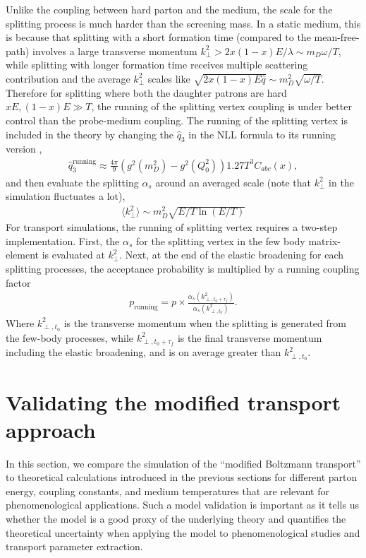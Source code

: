 Unlike the coupling between hard parton and the medium, the scale for the splitting process is much harder than the screening mass.
In a static medium, this is because that splitting with a short formation time (compared to the mean-free-path) involves a large transverse momentum $k_\perp^2 > 2x(1-x)E /\lambda \sim m_D \omega/T$, while splitting with longer formation time receives multiple scattering contribution and the average $k_\perp^2$ scales like $\sqrt{2x(1-x)E\hat{q}} \sim m_D^2 \sqrt{\omega/T}$.
Therefore for splitting where both the daughter patrons are hard $xE, (1-x)E \gg T$, the running of the splitting vertex coupling is under better control than the probe-medium coupling.
The running of the splitting vertex is included in the theory by changing the $\hat{q}_3$ in the NLL formula to its running version  \cite{Arnold:2008zu},
\begin{eqnarray}
\hat{q}_3^{\textrm{running}} \approx \frac{4\pi}{9}\left(g^2(m_D^2) - g^2(Q_0^2)\right) 1.27 T^3 C_{abc}(x),
\label{eq:q3running}
\end{eqnarray}
and then evaluate the splitting $\alpha_s$ around an averaged scale (note that $k_\perp^2$ in the simulation fluctuates a lot),
\begin{eqnarray}
\langle k_\perp^2\rangle \sim m_D^2 \sqrt{E/T\ln(E/T)}
\label{eq:runscale}
\end{eqnarray}  
For transport simulations, the running of splitting vertex requires a two-step implementation. 
First, the $\alpha_s$ for the splitting vertex in the few body matrix-element is evaluated at $k_\perp^2$.
Next, at the end of the elastic broadening for each splitting processes, the acceptance probability is multiplied by a running coupling factor
\begin{eqnarray}
p_{\textrm{running}} = p\times \frac{\alpha_s(k_{\perp,t_0+\tau_f}^2)}{\alpha_s(k_{\perp,t_0}^2)}.
\end{eqnarray}
Where $k_{\perp,t_0}^2$ is the transverse momentum when the splitting is generated from the few-body processes, while $k_{\perp,t_0+\tau_f}^2$ is the final transverse momentum including the elastic broadening, and is on average greater than $k_{\perp,t_0}^2$.

\section{Validating the modified transport approach}
\label{section:valiate_lido}
In this section, we compare the simulation of the ``modified Boltzmann transport'' to theoretical calculations introduced in the previous sections for different parton energy, coupling constants, and medium temperatures that are relevant for phenomenological applications.
Such a model validation is important as it tells us whether the model is a good proxy of the underlying theory and quantifies the theoretical uncertainty when applying the model to phenomenological studies and transport parameter extraction.

